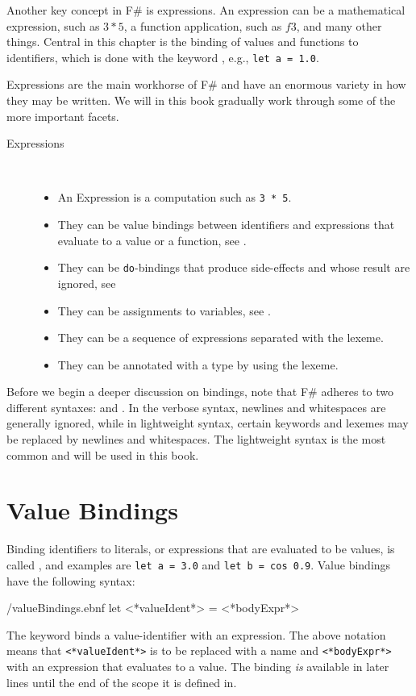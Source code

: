 \documentclass[fsharpNotes.tex]{subfiles}
\begin{document}
Another key concept in F\# is expressions. An expression can be a mathematical expression, such as $3*5$, a function application, such as $f 3$, and many other things. Central in this chapter is the binding of values and functions to identifiers, which is done with the keyword , e.g., \lstinline!let a = 1.0!.

Expressions are the main workhorse of F\# and have an enormous variety in how they may be written. We will in this book gradually work through some of the more important facets.
\begin{description} 
\item[Expressions]~\\[-5mm]
  \begin{itemize}
  \item An Expression is a computation such as \lstinline{3 * 5}.
  \item They can be value bindings between identifiers and expressions that evaluate to a value or a function, see .
  \item They can be \lstinline{do}-bindings that produce side-effects and whose result are ignored, see  
  \item They can be assignments to variables, see .
  \item They can be a sequence of expressions separated with the \idx[;@\lstinline{;}]{\lexeme{;}} lexeme.
  \item They can be annotated with a type by using the \idx[:@\lstinline{:}]{\lexeme{:}} lexeme.
  \end{itemize}
\end{description}

Before we begin a deeper discussion on bindings, note that F\#  adheres to two different syntaxes:  and . In the verbose syntax, newlines and whitespaces are generally ignored, while in lightweight syntax, certain keywords and lexemes may be replaced by newlines and whitespaces. The lightweight syntax is the most common and will be used in this book.

\section{Value Bindings}
\label{sec:values}
Binding identifiers to literals, or expressions that are evaluated to be values, is called , and examples are \lstinline!let a = 3.0! and \lstinline!let b = cos 0.9!. Value bindings have the following syntax:
%
\begin{verbatimwrite}{\ebnf/valueBindings.ebnf}
let <*valueIdent*> = <*bodyExpr*>
\end{verbatimwrite}
%
The  keyword binds a value-identifier with an expression. The above notation means that \lstinline[language=syntax]{<*valueIdent*>} is to be replaced with a name and \lstinline[language=syntax]{<*bodyExpr*>} with an expression that evaluates to a value. The binding \emph{is} available in later lines until the end of the scope it is defined in.
\end{document}
